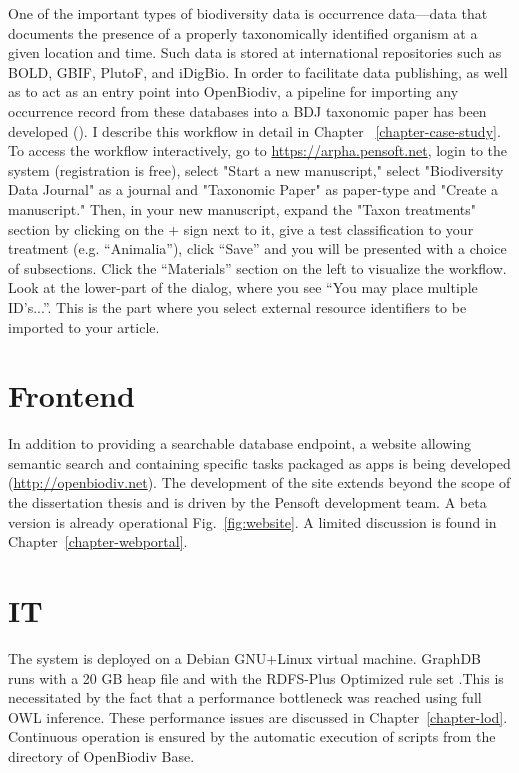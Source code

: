 One of the important types of biodiversity data is occurrence data---data that documents the presence of a properly taxonomically identified organism at a given location and time. Such data is stored at international repositories such as BOLD, GBIF, PlutoF, and iDigBio. In order to facilitate data publishing, as well as to act as an entry point into OpenBiodiv, a pipeline for importing any occurrence record from these databases into a BDJ taxonomic paper has been developed (\cite{senderov_online_2016}). I describe this workflow in detail in Chapter ~\ref{chapter-case-study}. To access the workflow interactively, go to \url{https://arpha.pensoft.net}, login to the system (registration is free), select "Start a new manuscript," select "Biodiversity Data Journal" as a journal and "Taxonomic Paper" as paper-type and "Create a manuscript." Then, in your new manuscript, expand the "Taxon treatments" section by clicking on the $+$ sign next to it, give a test classification to your treatment (e.g. ``Animalia''), click ``Save'' and you will be presented with a choice of subsections. Click the ``Materials'' section on the left to visualize the workflow. Look at the lower-part of the dialog, where you see ``You may place multiple ID's...''. This is the part where you select external resource identifiers to be imported to your article.

\section{Frontend}

In addition to providing a searchable database endpoint, a website allowing semantic search and containing specific tasks packaged as apps is being developed (\url{http://openbiodiv.net}). The development of the site extends beyond the scope of the dissertation thesis and is driven by the Pensoft development team. A beta version is already operational Fig.~\ref{fig:website}. A limited discussion is found in Chapter~\ref{chapter-webportal}.

\section{IT}

The system is deployed on a Debian GNU+Linux virtual machine. GraphDB runs with a 20 GB heap file and with the RDFS-Plus Optimized rule set .This is necessitated by the fact that a performance bottleneck was reached using full OWL inference. These performance issues are discussed in Chapter~\ref{chapter-lod}.  Continuous operation is ensured by the automatic execution of scripts from the  directory of OpenBiodiv Base.

